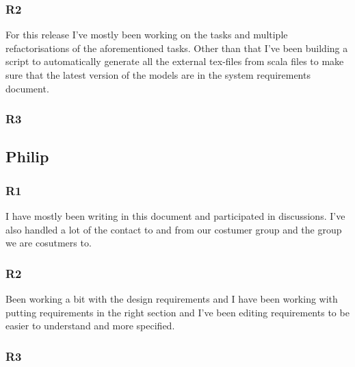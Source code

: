 \documentclass[a4paper]{article}
\begin{document}
		\subsubsection{R2}
	For this release I've mostly been working on the tasks and multiple refactorisations of the aforementioned tasks. Other than that I've been building a script to automatically generate all the external tex-files from scala files to make sure that the latest version of the models are in the system requirements document.
		\subsubsection{R3}

	\subsection{Philip}
		\subsubsection{R1}
	I have mostly been writing in this document and participated in discussions. I've also handled a lot of the contact to and from our costumer group and the group we are cosutmers to.
		\subsubsection{R2}
		Been working a bit with the design requirements and I have been working with putting requirements in the right section and I've been editing requirements to be easier to understand and more specified. 
		\subsubsection{R3}
\end{document}
